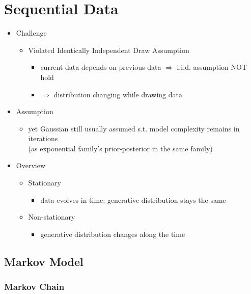 \chapter{Sequential Data}

\begin{itemize}
\item Challenge
	\begin{itemize}
	\item Violated Identically Independent Draw Assumption
		\begin{itemize}
		\item current data depends on previous data $\Rightarrow$ i.i.d. assumption NOT hold
		\item $\Rightarrow$ distribution changing while drawing data
		\end{itemize}
	\end{itemize}
\item Assumption
	\begin{itemize}
	\item yet Gaussian still usually assumed s.t. model complexity remains in iterations \\
	(as exponential family's prior-posterior in the same family)
	\end{itemize}
\item Overview
	\begin{itemize}
	\item Stationary
		\begin{itemize}
		\item data evolves in time; generative distribution stays the same
		\end{itemize}
	\item Non-stationary
		\begin{itemize}
		\item generative distribution changes along the time
		\end{itemize}
	\end{itemize}
\end{itemize}

\section{Markov Model}
\subsection{Markov Chain}
